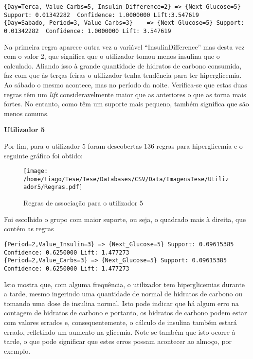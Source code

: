 \begin{lstlisting}
{Day=Terca, Value_Carbs=5, Insulin_Difference=2} => {Next_Glucose=5} Support: 0.01342282  Confidence: 1.0000000 Lift:3.547619
{Day=Sabado, Period=3, Value_Carbs=3}    => {Next_Glucose=5} Support: 0.01342282  Confidence: 1.0000000 Lift: 3.547619
\end{lstlisting}
Na primeira regra aparece outra vez a variável ``Insulin\textunderscore Difference'' mas desta vez com o valor 2, que significa que o utilizador tomou menos insulina que o calculado. Aliando isso à grande quantidade de hidratos de carbono consumida, faz com que às terças-feiras o utilizador tenha tendência para ter hiperglicemia. Ao sábado o mesmo acontece, mas no período da noite. Verifica-se que estas duas regras têm um \textit{lift} consideravelmente maior que as anteriores o que as torna mais fortes. No entanto, como têm um suporte mais pequeno, também significa que são menos comuns.


\textbf{Utilizador 5}

Por fim, para o utilizador 5 foram descobertas 136 regras para hiperglicemia e o seguinte gráfico foi obtido:

\begin{figure}[H]
\centering
\texttt{[image: /home/tiago/Tese/Tese/Databases/CSV/Data/ImagensTese/Utilizador5/Regras.pdf]}
\caption{Regras de associação para o utilizador 5}
\end{figure}
Foi escolhido o grupo com maior suporte, ou seja, o quadrado mais à direita, que contém as regras

\begin{lstlisting}
{Period=2,Value_Insulin=3} => {Next_Glucose=5} Support: 0.09615385  Confidence: 0.6250000 Lift: 1.477273
{Period=2,Value_Carbs=3} => {Next_Glucose=5} Support: 0.09615385  Confidence: 0.6250000 Lift: 1.477273
\end{lstlisting}
Isto mostra que, com alguma frequência, o utilizador tem hiperglicemias durante a tarde, mesmo ingerindo uma quantidade de normal de hidratos de carbono ou tomando uma dose de insulina normal. Isto pode indicar que há algum erro na contagem de hidratos de carbono e portanto, os hidratos de carbono podem estar com valores errados e, consequentemente, o cálculo de insulina também estará errado, refletindo um aumento na glicemia. Note-se também que isto ocorre à tarde, o que pode significar que estes erros possam acontecer ao almoço, por exemplo.\newline

